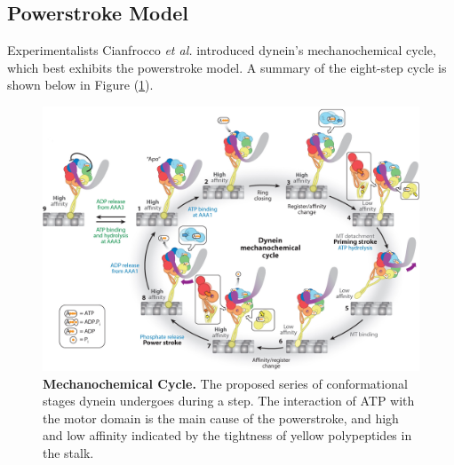 \newpage


\subsection{Powerstroke Model}

Experimentalists Cianfrocco \textit{et al.} introduced dynein's mechanochemical cycle, which best exhibits the powerstroke model. A summary of the eight-step cycle is shown below in Figure (\ref{fig:MechanochemicalCycle}).

\begin{figure}[H]
	\centering
	\includegraphics[width=1\columnwidth]{Figures/mechanochemical_cycle.jpeg}
	\caption[Mechanochemical Cycle]{\textbf{Mechanochemical Cycle.} The proposed series of conformational stages dynein undergoes during a step. The interaction of ATP with the motor domain is the main cause of the powerstroke, and high and low affinity indicated by the tightness of yellow polypeptides in the stalk. \cite{Cianfrocco2015mechanism}}
	\label{fig:MechanochemicalCycle}
\end{figure}

